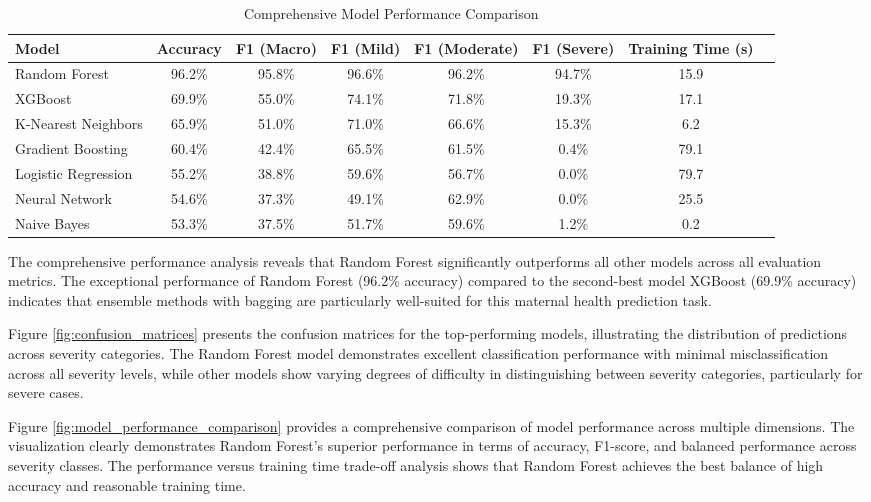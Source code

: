\documentclass[12pt]{report}
\begin{document}
\begin{table}[H]
\centering
\caption{Comprehensive Model Performance Comparison}
\label{tab:model_performance}
\begin{tabular}{|l|c|c|c|c|c|c|c|}
\hline
\textbf{Model} & \textbf{Accuracy} & \textbf{F1 (Macro)} & \textbf{F1 (Mild)} & \textbf{F1 (Moderate)} & \textbf{F1 (Severe)} & \textbf{Training Time (s)} \\
\hline
Random Forest & 96.2\% & 95.8\% & 96.6\% & 96.2\% & 94.7\% & 15.9 \\
\hline
XGBoost & 69.9\% & 55.0\% & 74.1\% & 71.8\% & 19.3\% & 17.1 \\
\hline
K-Nearest Neighbors & 65.9\% & 51.0\% & 71.0\% & 66.6\% & 15.3\% & 6.2 \\
\hline
Gradient Boosting & 60.4\% & 42.4\% & 65.5\% & 61.5\% & 0.4\% & 79.1 \\
\hline
Logistic Regression & 55.2\% & 38.8\% & 59.6\% & 56.7\% & 0.0\% & 79.7 \\
\hline
Neural Network & 54.6\% & 37.3\% & 49.1\% & 62.9\% & 0.0\% & 25.5 \\
\hline
Naive Bayes & 53.3\% & 37.5\% & 51.7\% & 59.6\% & 1.2\% & 0.2 \\
\hline
\end{tabular}
\end{table}

The comprehensive performance analysis reveals that Random Forest significantly outperforms all other models across all evaluation metrics. The exceptional performance of Random Forest (96.2\% accuracy) compared to the second-best model XGBoost (69.9\% accuracy) indicates that ensemble methods with bagging are particularly well-suited for this maternal health prediction task.

Figure \ref{fig:confusion_matrices} presents the confusion matrices for the top-performing models, illustrating the distribution of predictions across severity categories. The Random Forest model demonstrates excellent classification performance with minimal misclassification across all severity levels, while other models show varying degrees of difficulty in distinguishing between severity categories, particularly for severe cases.

Figure \ref{fig:model_performance_comparison} provides a comprehensive comparison of model performance across multiple dimensions. The visualization clearly demonstrates Random Forest's superior performance in terms of accuracy, F1-score, and balanced performance across severity classes. The performance versus training time trade-off analysis shows that Random Forest achieves the best balance of high accuracy and reasonable training time.
\end{document}
